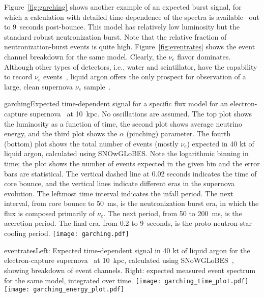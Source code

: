 Figure~\ref{fig:garching} shows another example of an expected burst
signal, for which a calculation with detailed time-dependence of the
spectra is available~\cite{Huedepohl:2009wh} out to 9~seconds
post-bounce.  This model has relatively low luminosity but the standard robust
neutronization burst.   Note that the relative fraction of
neutronization-burst events is quite high.
Figure~\ref{fig:eventrates} shows the event channel breakdown for the same model.  Clearly, the $\nu_e$
flavor dominates.  Although other types of detectors, i.e., water and scintillator, have the capability to record $\nu_e$ events~\cite{Laha:2013hva,Laha:2014yua}, liquid argon offers the only prospect for observation of a large, clean supernova $\nu_e$ sample~\cite{Scholberg:2012id}.


\begin{cdrfigure}{garching}{Expected
  time-dependent signal for a specific flux model for an
  electron-capture supernova~\cite{Huedepohl:2009wh} at 10~kpc.  No oscillations are assumed. The
  top plot shows the luminosity as a function of time, the second plot
  shows average neutrino energy, and the third plot shows the $\alpha$
  (pinching) parameter.  The fourth (bottom) plot shows the total number of
  events (mostly $\nu_e$) expected in 40 kt of liquid argon, calculated using
  SNOwGLoBES.  Note the logarithmic binning in time; the plot shows
  the number of events expected in the given bin and the error bars
  are statistical. The vertical dashed line at 0.02 seconds indicates
  the time of core bounce, and the vertical lines indicate different
  eras in the supernova evolution.  The leftmost time interval
  indicates the infall period.  The next interval, from core bounce to
  50~ms, is the neutronization burst era, in which the flux is
  composed primarily of $\nu_e$.  The next period, from 50 to 200~ms,
  is the accretion period. The final era, from 0.2 to 9~seconds, is
  the proto-neutron-star cooling period.}
\texttt{[image: garching.pdf]}
\end{cdrfigure}


\begin{cdrfigure}{eventrates}{Left: Expected
  time-dependent signal in 40 kt of liquid argon for the electron-capture supernova~\cite{Huedepohl:2009wh} at 10~kpc, calculated using SNoWGLoBES~\cite{snowglobes}, showing breakdown of event channels.  Right: expected measured event spectrum for the same model, integrated over time.}
\texttt{[image: garching\_time\_plot.pdf]}
\texttt{[image: garching\_energy\_plot.pdf]}
\end{cdrfigure}

